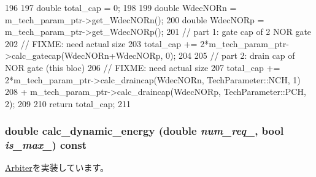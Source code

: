 \begin{DoxyCode}
196 {
197     double total_cap = 0;
198 
199     double WdecNORn = m_tech_param_ptr->get_WdecNORn();
200     double WdecNORp = m_tech_param_ptr->get_WdecNORp();
201     // part 1: gate cap of 2 NOR gate
202     // FIXME: need actual size
203     total_cap += 2*m_tech_param_ptr->calc_gatecap(WdecNORn+WdecNORp, 0);
204 
205     // part 2: drain cap of NOR gate (this bloc)
206     // FIXME: need actual size
207     total_cap += 2*m_tech_param_ptr->calc_draincap(WdecNORn, TechParameter::NCH, 
      1)
208         + m_tech_param_ptr->calc_draincap(WdecNORp, TechParameter::PCH, 2);
209 
210     return total_cap;
211 }
\end{DoxyCode}
\hypertarget{classRRArbiter_adf7ecbfcfee50be4847889bf0bc725b1}{
\subsubsection[{calc\_\-dynamic\_\-energy}]{\setlength{\rightskip}{0pt plus 5cm}double calc\_\-dynamic\_\-energy (double {\em num\_\-req\_\-}, \/  bool {\em is\_\-max\_\-}) const}}
\label{classRRArbiter_adf7ecbfcfee50be4847889bf0bc725b1}


\hyperlink{classArbiter_a11ad46c0a5f20df98190b479117a7dee}{Arbiter}を実装しています。


